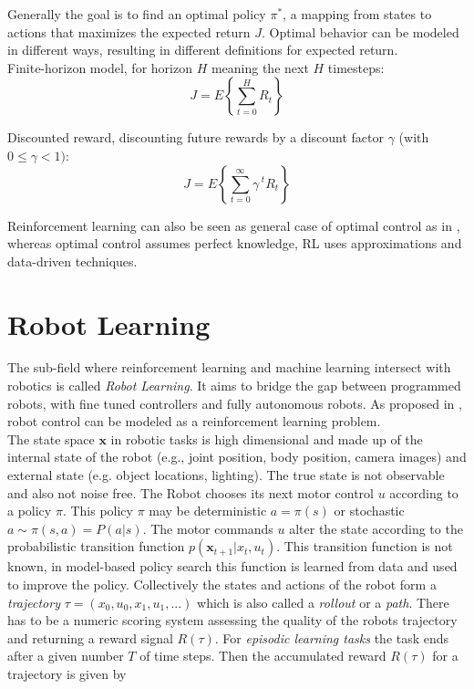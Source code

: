 Generally the goal is to find an optimal policy $\pi^*$,
a mapping from states to actions that
maximizes the expected return $J$.
Optimal behavior can be modeled in
different ways, resulting in different
definitions for expected return. \\
Finite-horizon model, for horizon $H$ meaning the next $H$ timesteps:
$$ J = E \left\{\sum^H_{t=0} R_t \right\} $$

Discounted reward, discounting future rewards by a discount factor $\gamma$
(with $0 \leq \gamma < 1)$:
$$ J = E \left\{\sum^{\infty}_{t=0} \gamma^{\; t} R_t \right\} $$


Reinforcement learning can also be seen as
general case of optimal control as in \citet{sutton1992reinforcement},
whereas optimal control assumes perfect knowledge, RL uses approximations
and data-driven techniques.



\section{Robot Learning}
The sub-field where reinforcement learning and machine learning
intersect with robotics is called \textit{Robot Learning}. It aims to bridge
the gap between programmed robots,
with fine tuned controllers  and fully autonomous robots.
As proposed in \citet{deisenroth2013survey}, robot control can be modeled as
a reinforcement learning problem. \\
The state space $\mathbf{x}$ in robotic tasks is high dimensional and made up of
the internal state of the robot (e.g., joint position, body position, camera images)
and external state (e.g. object locations, lighting). The true state is
not observable and also not noise free. 
The Robot chooses its next motor control $u$ according to a policy $\pi$.
This policy $\pi$ may
be deterministic $a = \pi(s)$ or stochastic $a \sim \pi(s,a) = P(a | s)$.
The motor commands $u$ alter the state according to the probabilistic
transition function $p(\mathbf{x}_{t+1} | x_t, u_t)$. This transition function
is not known, in model-based policy search this function is learned from data and
used to improve the policy.
Collectively the states and actions of the robot form a
\textit{trajectory} $\tau = (x_0, u_0, x_1, u_1,...)$ which is also called
a \textit{rollout} or a \textit{path}.
There has to be a numeric scoring system assessing the quality
of the robots trajectory and returning a reward signal $R(\tau)$.
For \textit{episodic learning tasks} the task ends after a given number $T$ of time
steps. Then the accumulated reward $R(\tau)$ for a trajectory is given by

